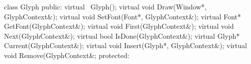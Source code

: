   class Glyph {
    public:
    virtual ~Glyph();
    virtual void Draw(Window*, GlyphContext\&);
    virtual void SetFont(Font*, GlyphContext\&);
    virtual Font* GetFont(GlyphContext\&);
    virtual void First(GlyphContext\&);
    virtual void Next(GlyphContext\&);
    virtual bool IsDone(GlyphContext\&);
    virtual Glyph* Current(GlyphContext\&);
    virtual void Insert(Glyph*, GlyphContext\&);
    virtual void Remove(GlyphContext\&};
  protected:
  
